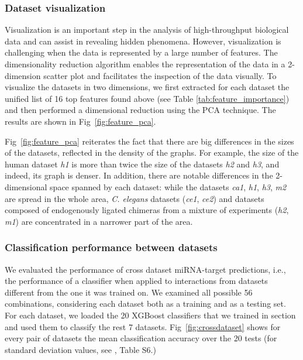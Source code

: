 \documentclass{bmcart}
\begin{document}
\subsubsection*{Dataset visualization}
Visualization is an important step in the analysis of high-throughput biological data and can assist in revealing hidden phenomena. However, visualization is challenging when the data is represented by a large number of features. The dimensionality reduction algorithm enables the representation of the data in a 2-dimension scatter plot and facilitates the inspection of the data visually. To visualize the datasets in two dimensions, we first extracted for each dataset the unified list of 16 top features found above (see Table \ref{tab:feature_importance}) and then performed a dimensional reduction using the PCA technique. The results are shown in Fig~\ref{fig:feature_pca}.


Fig~\ref{fig:feature_pca} reiterates the fact that there are big differences in the sizes of the datasets, reflected in the density of the graphs. For example, the size of the human dataset \textit{h1} is more than twice the size of the datasets \textit{h2} and \textit{h3}, and indeed, its graph is denser. In addition, there are notable differences in the 2-dimensional space spanned by each dataset: while the datasets \textit{ca1}, \textit{h1}, \textit{h3}, \textit{m2} are spread in the whole area, \textit{C. elegans} datasets (\textit{ce1}, \textit{ce2}) and datasets composed of endogenously ligated chimeras from a mixture of experiments (\textit{h2}, \textit{m1}) are concentrated in a narrower part of the area.

\subsubsection*{Classification performance between datasets}
We evaluated the performance of cross dataset miRNA-target predictions, i.e., the performance of a classifier when applied to interactions from datasets different from the one it was trained on.
We examined all possible 56 combinations, considering each dataset both as a training and as a testing set. 
For each dataset, we loaded the 20 XGBoost classifiers that we trained in section  and used them to classify the rest 7 datasets. Fig~\ref{fig:crossdataset} shows for every pair of datasets the mean classification accuracy over the 20 tests (for standard deviation values, see , Table S6.)
\end{document}
